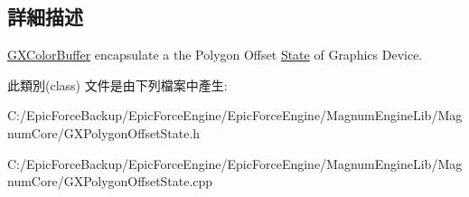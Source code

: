 \subsection{詳細描述}
\hyperlink{class_magnum_1_1_g_x_color_buffer}{G\+X\+Color\+Buffer} encapsulate a the Polygon Offset \hyperlink{class_magnum_1_1_state}{State} of Graphics Device. 

此類別(class) 文件是由下列檔案中產生\+:\begin{DoxyCompactItemize}
\item 
C\+:/\+Epic\+Force\+Backup/\+Epic\+Force\+Engine/\+Epic\+Force\+Engine/\+Magnum\+Engine\+Lib/\+Magnum\+Core/G\+X\+Polygon\+Offset\+State.\+h\item 
C\+:/\+Epic\+Force\+Backup/\+Epic\+Force\+Engine/\+Epic\+Force\+Engine/\+Magnum\+Engine\+Lib/\+Magnum\+Core/G\+X\+Polygon\+Offset\+State.\+cpp\end{DoxyCompactItemize}
